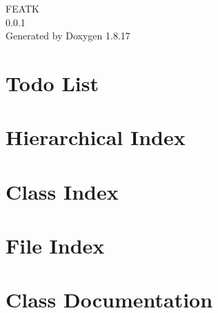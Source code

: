\let\mypdfximage\pdfximage\def\pdfximage{\immediate\mypdfximage}\documentclass[twoside]{book}
\newcommand{\+}{\discretionary{\mbox{\scriptsize$\hookleftarrow$}}{}{}}
\newcommand{\clearemptydoublepage}{%
  \newpage{\pagestyle{empty}\cleardoublepage}%
}
\begin{document}
\hypersetup{pageanchor=false,
             bookmarksnumbered=true,
             pdfencoding=unicode
            }
\begin{titlepage}
\vspace*{7cm}
\begin{center}%
{\Large F\+E\+A\+TK \\[1ex]\large 0.\+0.\+1 }\\
\vspace*{1cm}
{\large Generated by Doxygen 1.8.17}\\
\end{center}
\end{titlepage}
\clearemptydoublepage
{}
\tableofcontents
\clearemptydoublepage
{}
\hypersetup{pageanchor=true}

\chapter{Todo List}
\label{todo}

\chapter{Hierarchical Index}

\chapter{Class Index}

\chapter{File Index}

\chapter{Class Documentation}


























\end{document}
